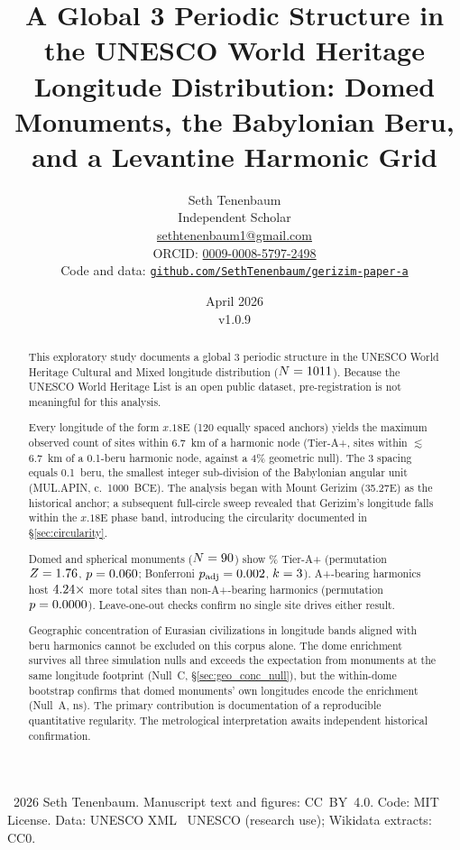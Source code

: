 \documentclass[12pt,a4paper]{article}
\title{A Global 3\textdegree{} Periodic Structure in the UNESCO World Heritage\\
Longitude Distribution: Domed Monuments, the Babylonian Beru,\\
and a Levantine Harmonic Grid}
\author{Seth Tenenbaum\\
\small Independent Scholar\\
\small \href{mailto:sethtenenbaum1@gmail.com}{sethtenenbaum1@gmail.com}\\
\small ORCID: \href{https://orcid.org/0009-0008-5797-2498}{0009-0008-5797-2498}\\[4pt]
\small Code and data: \href{https://github.com/SethTenenbaum/gerizim-paper-a}{\texttt{github.com/SethTenenbaum/gerizim-paper-a}}
}
\date{April 2026\\v1.0.9}
\begin{document}
\maketitle

\noindent\textcopyright~2026 Seth Tenenbaum.
Manuscript text and figures: CC~BY~4.0.
Code: MIT License.
Data: UNESCO XML \textcopyright~UNESCO (research use); Wikidata extracts: CC0.

\begin{abstract}
This exploratory study documents a global 3\textdegree{} periodic structure
in the UNESCO World Heritage Cultural and Mixed longitude distribution
($N = 1011$). Because the UNESCO World Heritage List is an open
public dataset, pre-registration is not meaningful for this analysis.

Every longitude of the form $x.18$\textdegree{}E (120 equally spaced anchors)
yields the maximum observed count of sites within 6.7~km of a harmonic node
(Tier-A+, sites within $\lesssim$6.7~km of a 0.1-beru harmonic node,
against a 4\% geometric null). The 3\textdegree{} spacing equals
0.1~beru, the smallest integer sub-division of the Babylonian angular unit
(MUL.APIN, c.~1000~BCE). The analysis began with Mount Gerizim
(35.27\textdegree{}E) as the historical anchor; a subsequent full-circle sweep
revealed that Gerizim's longitude falls within the $x.18$\textdegree{}E phase
band, introducing the circularity documented in \S\ref{sec:circularity}.

Domed and spherical monuments ($N = 90$) show \NcircApRate\%
Tier-A+ (permutation $Z = 1.76$, $p = 0.060$;
Bonferroni $p_\mathrm{adj} = 0.002$, $k = 3$).
A+-bearing harmonics host $4.24\times$ more total sites
than non-A+-bearing harmonics (permutation $p = 0.0000$).
Leave-one-out checks confirm no single site drives either result.

Geographic concentration of Eurasian civilizations in longitude bands
aligned with beru harmonics cannot be excluded on this corpus alone.
The dome enrichment survives all three simulation nulls and exceeds the
expectation from monuments at the same longitude footprint
(Null~C, \S\ref{sec:geo_conc_null}), but the within-dome bootstrap
confirms that domed monuments' own longitudes encode the enrichment
(Null~A, ns). The primary contribution is documentation of a reproducible
quantitative regularity. The metrological interpretation awaits independent
historical confirmation.
\end{abstract}
\end{document}
